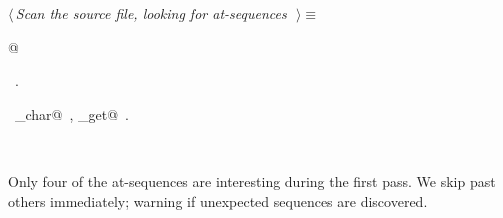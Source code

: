 \documentclass{report}
\begin{document}
\begin{flushleft} \small
\begin{minipage}{\linewidth} \label{scrap33}
$\langle\,${\it Scan the source file, looking for at-sequences}\nobreak\ {\footnotesize {}}$\,\rangle\equiv$
\vspace{-1ex}
\begin{list}{}{} \item
\mbox{}@{\NWsep}
\end{list}
\vspace{-1ex}
\footnotesize\addtolength{\baselineskip}{-1ex}
\begin{list}{}{\setlength{\itemsep}{-\parsep}\setlength{\itemindent}{-\leftmargin}}
\item \NWtxtMacroRefIn\ .
\end{list}
\vspace{-2ex}
\footnotesize\addtolength{\baselineskip}{-1ex}
\begin{list}{}{\setlength{\itemsep}{-\parsep}\setlength{\itemindent}{-\leftmargin}}
\item \NWtxtIdentsUsed\nobreak\  \verb@nw_char@\nobreak\ , \verb@source_get@\nobreak\ .\end{list}
\end{minipage}\\[4ex]
\end{flushleft}
Only four of the at-sequences are interesting during the first pass.
We skip past others immediately; warning if unexpected sequences are
discovered.
\end{document}
